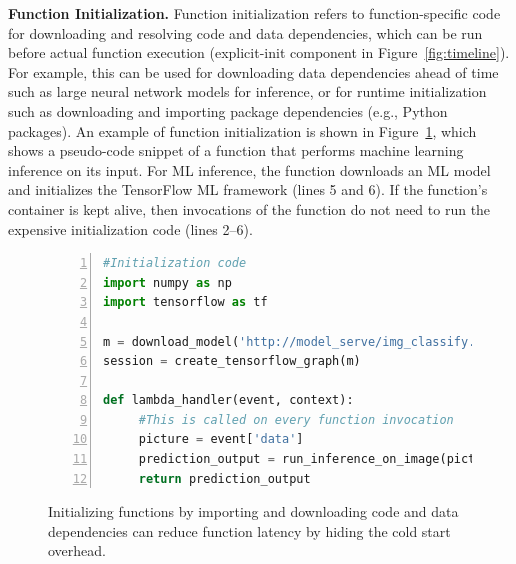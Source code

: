 \noindent \textbf{Function Initialization.}
%
Function initialization refers to function-specific code for downloading and resolving code and data dependencies, which can be run before actual function execution (explicit-init component in Figure~\ref{fig:timeline}). 
For example, this can be used for downloading data dependencies ahead of time such as large neural network models for inference, or for runtime initialization such as downloading and importing package dependencies (e.g., Python packages). 
%
An example of function initialization is shown in Figure~\ref{fig:lambda-example}, which shows a pseudo-code snippet of a function that performs machine learning inference on its input. 
For ML inference, the function downloads an ML model and initializes the TensorFlow ML framework (lines  5 and 6). 
If the function's container is kept alive, then invocations of the function do not need to run the expensive initialization code (lines 2--6). 


\begin{figure}
\begin{lstlisting}[language=Python, numbers=left, frame=single, basicstyle=\small, columns=fullflexible, xleftmargin=10.0ex, xrightmargin=10.0ex]
#Initialization code 
import numpy as np 
import tensorflow as tf
  
m = download_model('http://model_serve/img_classify.pb')
session = create_tensorflow_graph(m) 
  
def lambda_handler(event, context):
     #This is called on every function invocation 
     picture = event['data']
     prediction_output = run_inference_on_image(picture) 
     return prediction_output 
   \end{lstlisting}
   \caption{Initializing functions by importing and downloading code and data dependencies can reduce function latency by hiding the cold start overhead.}
   \label{fig:lambda-example}
\end{figure}



